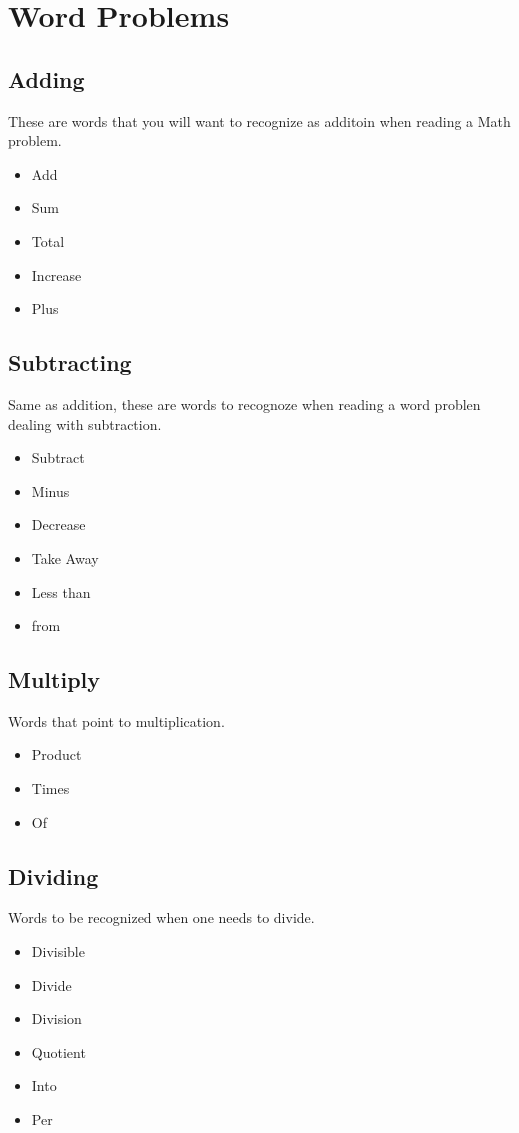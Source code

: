 \documentclass[]{article}
\begin{document}
\section{Word Problems}
\subsection{Adding}
These are words that you will want to recognize as additoin when reading a Math problem.
\begin{itemize}
\item Add
\item Sum
\item Total
\item Increase
\item Plus
\end{itemize}


\subsection{Subtracting}
Same as addition, these are words to recognoze when reading a word problen dealing with subtraction.
\begin{itemize}
	\item Subtract
	\item Minus
	\item Decrease
	\item Take Away
	\item Less than
	\item from
\end{itemize}


\subsection{Multiply}
Words that point to multiplication. 
\begin{itemize}
	\item Product
	\item Times 
	\item Of	
\end{itemize}
\subsection{Dividing}
Words to be recognized when one needs to divide. 
\begin{itemize}
	\item Divisible
	\item Divide
	\item Division
	\item Quotient
	\item Into
	\item Per
\end{itemize}
\end{document}
